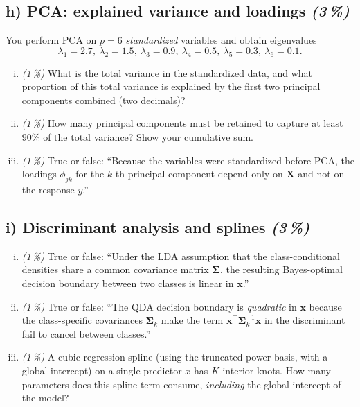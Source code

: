 \documentclass[11pt,a4paper]{article}
\newcommand{\subpoints}[1]{\textit{(#1\,\%)}}
\begin{document}
\subsection*{h) PCA: explained variance and loadings \subpoints{3}}
You perform PCA on $p = 6$ \emph{standardized} variables and obtain eigenvalues
$$\lambda_1 = 2.7,\ \lambda_2 = 1.5,\ \lambda_3 = 0.9,\ \lambda_4 = 0.5,\ \lambda_5 = 0.3,\ \lambda_6 = 0.1.$$
\begin{enumerate}[(i)]
  \item \subpoints{1} What is the total variance in the standardized data, and what proportion of this total variance is explained by the first two principal components combined (two decimals)?
  \item \subpoints{1} How many principal components must be retained to capture at least $90\%$ of the total variance? Show your cumulative sum.
  \item \subpoints{1} True or false: ``Because the variables were standardized before PCA, the loadings $\phi_{jk}$ for the $k$-th principal component depend only on $\mathbf X$ and not on the response $y$.''
\end{enumerate}

\subsection*{i) Discriminant analysis and splines \subpoints{3}}
\begin{enumerate}[(i)]
  \item \subpoints{1} True or false: ``Under the LDA assumption that the class-conditional densities share a common covariance matrix $\boldsymbol\Sigma$, the resulting Bayes-optimal decision boundary between two classes is linear in $\mathbf x$.''
  \item \subpoints{1} True or false: ``The QDA decision boundary is \emph{quadratic} in $\mathbf x$ because the class-specific covariances $\boldsymbol\Sigma_k$ make the term $\mathbf x^\top \boldsymbol\Sigma_k^{-1} \mathbf x$ in the discriminant fail to cancel between classes.''
  \item \subpoints{1} A cubic regression spline (using the truncated-power basis, with a global intercept) on a single predictor $x$ has $K$ interior knots. How many parameters does this spline term consume, \emph{including} the global intercept of the model?
\end{enumerate}

\vfill\eject

\end{document}
